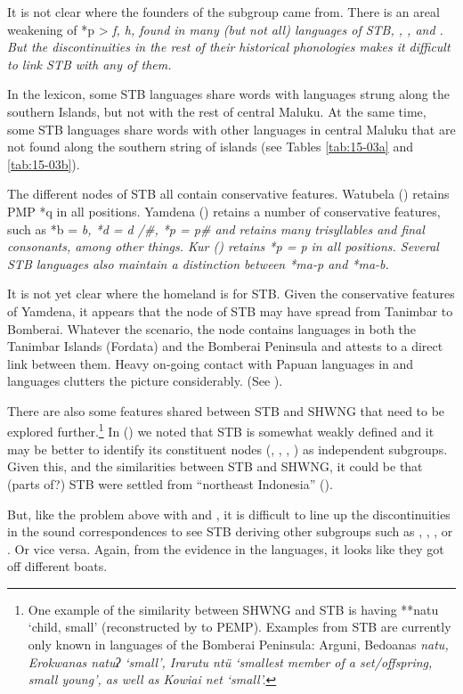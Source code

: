 It is not clear where the founders of the  subgroup came from.
There is an areal weakening of *p > \it{f,
h}, {\0} found in many (but not all) languages of STB,
, , and .
But the discontinuities in the rest of their historical phonologies
makes it difficult to link STB with any of them.

In the lexicon, some STB languages share words with languages
strung along the southern Islands,
but not with the rest of central Maluku.
At the same time,
some STB languages share words with other languages in central
Maluku that are not found along the southern string of islands
(see Tables \ref{tab:15-03a} and \ref{tab:15-03b}).

The different nodes of STB all contain conservative features.
Watubela () retains PMP *q in all positions.
Yamdena () retains a number of conservative
features, such as *b = \it{b},
*d = \it{d /{\#}{\gap}},
*p = \it{p}{\#} and retains many trisyllables
and final consonants, among other things.
Kur () retains *p = \it{p} in all positions.
Several STB languages also maintain a distinction between *ma-p and *ma-b.

It is not yet clear where the homeland is for STB.
Given the conservative features of Yamdena,
it appears that the  node of STB may have
spread from Tanimbar to Bomberai.
Whatever the scenario, the  node
contains languages in both the Tanimbar Islands (Fordata)
and the Bomberai Peninsula
and attests to a direct link between them.
Heavy on-going contact with Papuan languages in 
and  languages clutters the picture considerably. (See ).

There are also some features shared between STB
and SHWNG that need to be explored further.\footnote{
		One example of the similarity between SHWNG
		and STB is having **natu ‘child,
		small’ (reconstructed by \citealt{BlustTrussel2020} to PEMP).
		Examples from STB are currently only known in languages of the
		Bomberai Peninsula: Arguni, Bedoanas \it{natu}, Erokwanas \it{natuʔ} ‘small’,
		Irarutu \it{ntü}
		‘smallest member of a set/offspring,
		small young’, as well as Kowiai \it{net} ‘small’.}
In 
() we noted that STB is somewhat weakly defined
and it may be better to identify its constituent nodes (, , , )
as independent subgroups.
Given this, and the similarities between STB
and SHWNG, it could be that (parts of?) STB were
settled from “northeast Indonesia” ().

But, like the problem above with 
and , it is difficult to line up the discontinuities
in the sound correspondences to see STB deriving other subgroups
such as , , , or .
Or vice versa.
Again, from the evidence in the languages,
it looks like they got off different boats.